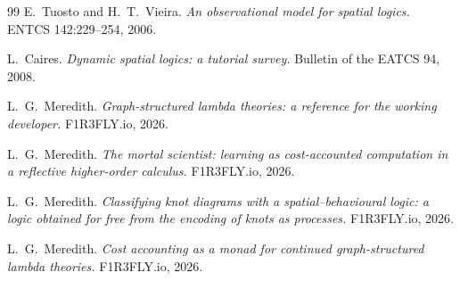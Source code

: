 \documentclass[11pt]{article}
\theoremstyle{plain}
\theoremstyle{definition}
\begin{document}
\begin{thebibliography}{99}
 E.\ Tuosto and H.\ T.\ Vieira. \emph{An observational model for spatial logics.}
ENTCS 142:229--254, 2006.

 L.\ Caires. \emph{Dynamic spatial logics: a tutorial survey.} Bulletin of the
EATCS 94, 2008.

 L.\ G.\ Meredith. \emph{Graph-structured lambda theories: a reference for the working
developer.} F1R3FLY.io, 2026.

 L.\ G.\ Meredith. \emph{The mortal scientist: learning as cost-accounted
computation in a reflective higher-order calculus.} F1R3FLY.io, 2026.

 L.\ G.\ Meredith. \emph{Classifying knot diagrams with a spatial--behavioural
logic: a logic obtained for free from the encoding of knots as processes.} F1R3FLY.io, 2026.

 L.\ G.\ Meredith. \emph{Cost accounting as a monad for continued graph-structured
lambda theories.} F1R3FLY.io, 2026.

\end{thebibliography}
\end{document}
